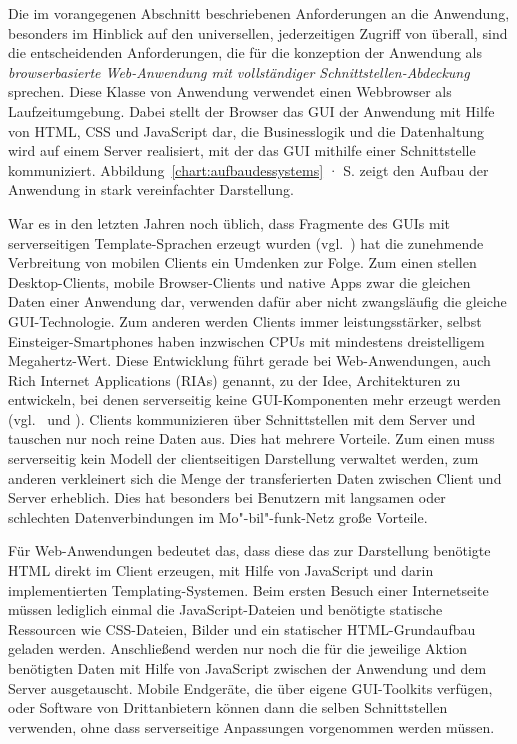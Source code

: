 Die im vorangegenen Abschnitt beschriebenen Anforderungen an die Anwendung, besonders im Hinblick auf den universellen, jederzeitigen Zugriff von überall, sind die entscheidenden Anforderungen, die für die konzeption der Anwendung als \emph{browserbasierte Web-Anwendung mit vollständiger Schnittstellen-Abdeckung} sprechen. Diese Klasse von Anwendung verwendet einen Webbrowser als Laufzeitumgebung. Dabei stellt der Browser das GUI der Anwendung mit Hilfe von HTML, CSS und JavaScript dar, die Businesslogik und die Datenhaltung wird auf einem Server realisiert, mit der das GUI mithilfe einer Schnittstelle kommuniziert. Abbildung~\ref{chart:aufbaudessystems} · S.\pageref{chart:aufbaudessystems} zeigt den Aufbau der Anwendung in stark vereinfachter Darstellung. 

War es in den letzten Jahren noch üblich, dass Fragmente des GUIs mit serverseitigen Template-Sprachen erzeugt wurden (vgl.~\cite[S.48]{dunkel2008systemarchitekturen}) hat die zunehmende Verbreitung von mobilen Clients ein Umdenken zur Folge. Zum einen stellen Desktop-Clients, mobile Browser-Clients und native Apps zwar die gleichen Daten einer Anwendung dar, verwenden dafür aber nicht zwangsläufig die gleiche GUI-Technologie. Zum anderen werden Clients immer leistungsstärker, selbst Einsteiger-Smartphones haben inzwischen CPUs mit mindestens dreistelligem Megahertz-Wert. Diese Entwicklung führt gerade bei Web-Anwendungen, auch Rich Internet Applications (RIAs) genannt, zu der Idee, Architekturen zu entwickeln, bei denen serverseitig keine GUI-Komponenten mehr erzeugt werden (vgl.~\cite{maccaw2011javascript} und \cite{coates2012phptemplating}). Clients kommunizieren über Schnittstellen mit dem Server und tauschen nur noch reine Daten aus. Dies hat mehrere Vorteile. Zum einen muss serverseitig kein Modell der clientseitigen Darstellung verwaltet werden, zum anderen verkleinert sich die Menge der transferierten Daten zwischen Client und Server erheblich. Dies hat besonders bei Benutzern mit langsamen oder schlechten Datenverbindungen im Mo"-bil"-funk-Netz große Vorteile. 

Für Web-Anwendungen bedeutet das, dass diese das zur Darstellung benötigte HTML direkt im Client erzeugen, mit Hilfe von JavaScript und darin implementierten Templating-Systemen. Beim ersten Besuch einer Internetseite müssen lediglich einmal die JavaScript-Dateien und benötigte statische Ressourcen wie CSS-Dateien, Bilder und ein statischer HTML-Grundaufbau geladen werden. Anschließend werden nur noch die für die jeweilige Aktion benötigten Daten mit Hilfe von JavaScript zwischen der Anwendung und dem Server ausgetauscht. Mobile Endgeräte, die über eigene GUI-Toolkits verfügen, oder Software von Drittanbietern können dann die selben Schnittstellen verwenden, ohne dass serverseitige Anpassungen vorgenommen werden müssen.

